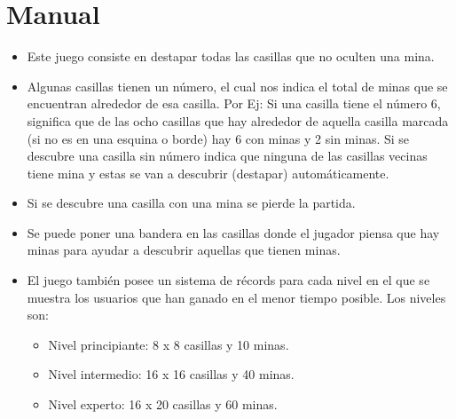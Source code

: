 \documentclass[11pt]{article} %
\begin{document}
\section{\fontsize{14}{0} \bf Manual}
\begin{itemize}
 \item Este juego consiste en destapar todas las casillas que no oculten una mina.\\
 \item Algunas casillas tienen un número, el cual nos indica el total de minas que se encuentran alrededor de esa casilla. Por Ej: Si una casilla tiene el número 6, significa que de las ocho casillas que hay alrededor de aquella casilla marcada (si no es en una esquina o borde) hay 6 con minas y 2 sin minas. Si se descubre una casilla sin número indica que ninguna de las casillas vecinas tiene mina y estas se van a descubrir (destapar) automáticamente.\\
 \item Si se descubre una casilla con una mina se pierde la partida.\\
 \item Se puede poner una bandera en las casillas donde el jugador piensa que hay minas para ayudar a descubrir aquellas que tienen minas.\\
 \item El juego también posee un sistema de récords para cada nivel en el que se muestra los usuarios que han ganado en el menor tiempo posible. Los niveles son:\\
\begin{itemize}
 \item Nivel principiante: 8 x 8 casillas y 10 minas.
 \item Nivel intermedio: 16 x 16 casillas y 40 minas.
 \item Nivel experto: 16 x 20 casillas y 60 minas.

\end{itemize}
\end{itemize}

\newpage
\end{document}
